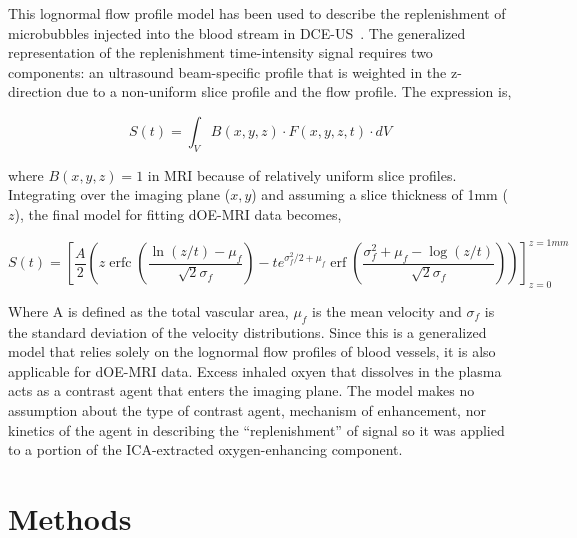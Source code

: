 This lognormal flow profile model has been used to describe the replenishment of microbubbles injected into the blood stream in \acs{DCE-US}~\cite{Hudson:2009jv}.
The generalized representation of the replenishment time-intensity signal requires two components: an ultrasound beam-specific profile that is weighted in the z-direction due to a non-uniform slice profile and the flow profile. 
The expression is,

\begin{equation}
S(t) = \int_{V} B(x,y,z) \cdot F(x,y,z,t) \cdot dV
\end{equation}

where $B(x,y,z) = 1$ in MRI because of relatively uniform slice profiles. 
Integrating over the imaging plane ($x,y$) and assuming a slice thickness of 1mm ($z$), the final model for fitting \acs{dOE-MRI} data becomes,

\begin{equation}
S(t)= \left[\frac{A}{2}\left(z \operatorname{erfc}\left(\frac{\ln \left(z/t\right)-\mu_f}{\sqrt{2} \sigma_f}\right)-t e^{\sigma_f^{2} / 2+\mu_f} \operatorname{erf}\left(\frac{\sigma_f^{2}+\mu_f-\log \left(z/t\right)}{\sqrt{2} \sigma_f}\right)\right)\right]_{z=0}^{z=1mm}
\label{lognormalFitEquation}
\end{equation}

Where A is defined as the total vascular area, $\mu_f$ is the mean velocity and $\sigma_f$ is the standard deviation of the velocity distributions. 
Since this is a generalized model that relies solely on the lognormal flow profiles of blood vessels, it is also applicable for \acs{dOE-MRI} data.
Excess inhaled oxyen that dissolves in the plasma acts as a contrast agent that enters the imaging plane.
The model makes no assumption about the type of contrast agent, mechanism of enhancement, nor kinetics of the agent in describing the ``replenishment'' of signal so it was applied to a portion of the ICA-extracted oxygen-enhancing component.

\section{Methods}
